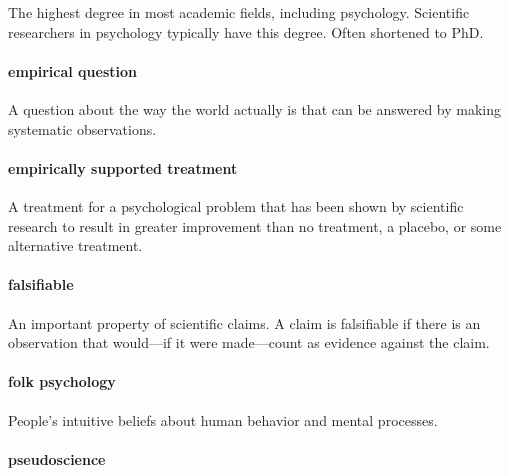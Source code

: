 \documentclass[
]{krantz}
\begin{document}
The highest degree in most academic fields, including psychology. Scientific researchers in psychology typically have this degree. Often shortened to PhD.

\hypertarget{empirical-question}{%
\paragraph*{empirical question}\label{empirical-question}}

A question about the way the world actually is that can be answered by making systematic observations.

\hypertarget{empirically-supported-treatment}{%
\paragraph*{empirically supported treatment}\label{empirically-supported-treatment}}

A treatment for a psychological problem that has been shown by scientific research to result in greater improvement than no treatment, a placebo, or some alternative treatment.

\hypertarget{falsifiable}{%
\paragraph*{falsifiable}\label{falsifiable}}

An important property of scientific claims. A claim is falsifiable if there is an observation that would---if it were made---count as evidence against the claim.

\hypertarget{folk-psychology}{%
\paragraph*{folk psychology}\label{folk-psychology}}

People's intuitive beliefs about human behavior and mental processes.

\hypertarget{pseudoscience}{%
\paragraph*{pseudoscience}\label{pseudoscience}}
\end{document}
